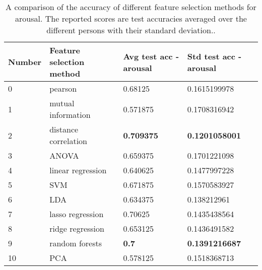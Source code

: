 \begin{table}[H]
\centering
\caption{A comparison of the accuracy of different feature selection methods for arousal. The reported scores are test accuracies averaged over the different persons with their standard deviation.\label{accCompLblarousal}.}
\begin{tabular}{llll}
\textbf{Number} & \textbf{Feature selection method} & \textbf{Avg test acc - arousal} & \textbf{Std test acc - arousal} \\ \hline
0               & pearson                           & 0.68125                             & 0.1615199978                    \\
1               & mutual information                & 0.571875                            & 0.1708316942                    \\
2               & distance correlation              & \textbf{0.709375}                   & \textbf{0.1201058001}           \\
3               & ANOVA                             & 0.659375                            & 0.1701221098                    \\
4               & linear regression                 & 0.640625                            & 0.1477997228                    \\
5               & SVM                               & 0.671875                            & 0.1570583927                    \\
6               & LDA                               & 0.634375                            & 0.138212961                     \\
7               & lasso regression                  & 0.70625                             & 0.1435438564                    \\
8               & ridge regression                  & 0.653125                            & 0.1436491582                    \\
9               & random forests                    & \textbf{0.7}                        & \textbf{0.1391216687}           \\
10              & PCA                               & 0.578125                            & 0.1518368713                   
\end{tabular}
\end{table}



